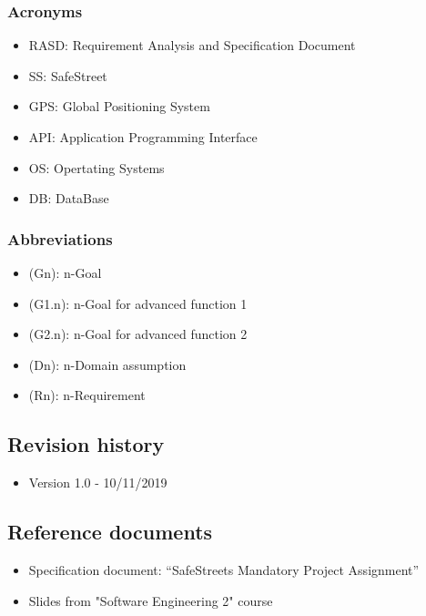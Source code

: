 \subsubsection{Acronyms}
\begin{itemize}
	\item RASD: Requirement Analysis and Specification Document
	\item SS: SafeStreet
	\item GPS: Global Positioning System
	\item API: Application Programming Interface
	\item OS: Opertating Systems
	\item DB: DataBase 
	\end{itemize}
\subsubsection{Abbreviations}
\begin{itemize}
	\item(Gn): n-Goal 
	\item(G1.n): n-Goal for advanced function 1 
	\item(G2.n): n-Goal for advanced function 2 
	\item(Dn): n-Domain assumption 
	\item(Rn): n-Requirement 
\end{itemize}
\subsection{Revision history}
\begin{itemize}
	\item Version 1.0 - 10/11/2019
\end{itemize}
\subsection{Reference documents}
\begin{itemize}
	\item Specification document: “SafeStreets Mandatory Project Assignment” 
	\item Slides from "Software Engineering 2" course
\end{itemize}
